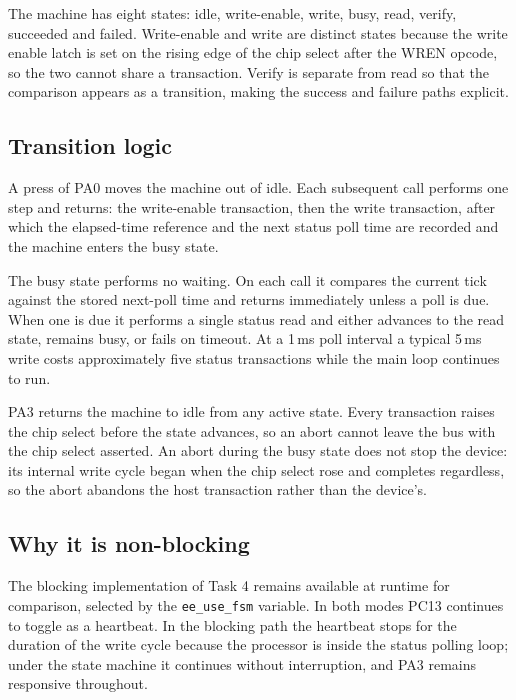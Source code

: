 \documentclass[conference]{IEEEtran}
\begin{document}
The machine has eight states: idle, write-enable, write, busy, read, verify,
succeeded and failed. Write-enable and write are distinct states because the
write enable latch is set on the rising edge of the chip select after the WREN
opcode, so the two cannot share a transaction. Verify is separate from read so
that the comparison appears as a transition, making the success and failure
paths explicit.

\subsection{Transition logic}

A press of PA0 moves the machine out of idle. Each subsequent call performs one
step and returns: the write-enable transaction, then the write transaction,
after which the elapsed-time reference and the next status poll time are
recorded and the machine enters the busy state.

The busy state performs no waiting. On each call it compares the current tick
against the stored next-poll time and returns immediately unless a poll is due.
When one is due it performs a single status read and either advances to the
read state, remains busy, or fails on timeout. At a 1\,ms poll interval a
typical 5\,ms write costs approximately five status transactions while the main
loop continues to run.

PA3 returns the machine to idle from any active state. Every transaction raises
the chip select before the state advances, so an abort cannot leave the bus
with the chip select asserted. An abort during the busy state does not stop the
device: its internal write cycle began when the chip select rose and completes
regardless, so the abort abandons the host transaction rather than the
device's.

\subsection{Why it is non-blocking}

The blocking implementation of Task 4 remains available at runtime for
comparison, selected by the \texttt{ee\_use\_fsm} variable. In both modes PC13
continues to toggle as a heartbeat. In the blocking path the heartbeat stops
for the duration of the write cycle because the processor is inside the status
polling loop; under the state machine it continues without interruption, and
PA3 remains responsive throughout.

\mFsmResult
\end{document}
